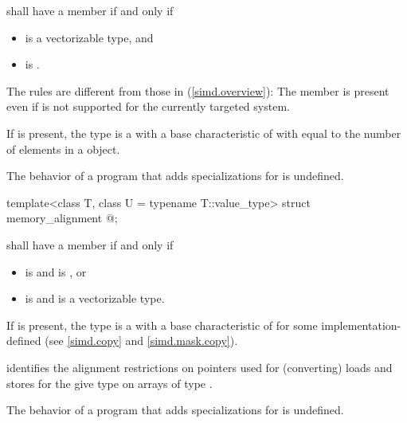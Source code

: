 \begin{itemdescr}
\pnum
{} shall have a member  if and only if
\begin{itemize}
  \item {} is a vectorizable type, and
  \item {} is .
\end{itemize}
\begin{note}
  The rules are different from those in (\ref{simd.overview}):
  The member  is present even if  is not supported for the currently targeted system.
\end{note}

\pnum
If  is present, the type  is a  with a base characteristic of  with  equal to the number of elements in a  object.

\pnum
The behavior of a program that adds specializations for  is undefined.
\end{itemdescr}

\begin{itemdecl}
template<class T, class U = typename T::value_type> struct memory_alignment { @\seebelow@ };
\end{itemdecl}

\begin{itemdescr}
\pnum
{} shall have a member  if and only if
\begin{itemize}
  \item {} is  and  is , or
  \item {} is  and  is a vectorizable type.
\end{itemize}

\pnum
If  is present, the type  is a  with a base characteristic of  for some implementation-defined  (see \ref{simd.copy} and \ref{simd.mask.copy}). \begin{note} identifies the alignment restrictions on pointers used for (converting) loads and stores for the give type  on arrays of type .\end{note}

\pnum
The behavior of a program that adds specializations for  is undefined.
\end{itemdescr}

